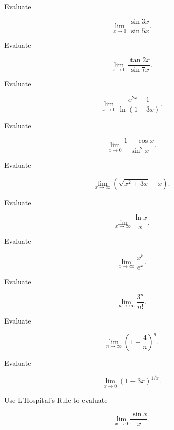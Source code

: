 \begin{exercise}[3]
Evaluate

\[
\lim_{x\to0}
\frac{\sin3x}{\sin5x}.
\]
\end{exercise}

\begin{exercise}[3]
Evaluate

\[
\lim_{x\to0}
\frac{\tan2x}{\sin7x}.
\]
\end{exercise}

\begin{exercise}[3]
Evaluate

\[
\lim_{x\to0}
\frac{e^{2x}-1}{\ln(1+3x)}.
\]
\end{exercise}

\begin{exercise}[3]
Evaluate

\[
\lim_{x\to0}
\frac{
1-\cos x
}{
\sin^2x
}.
\]
\end{exercise}

\begin{exercise}[3]
Evaluate

\[
\lim_{x\to\infty}
\left(
\sqrt{x^2+3x}-x
\right).
\]
\end{exercise}

\begin{exercise}[3]
Evaluate

\[
\lim_{x\to\infty}
\frac{\ln x}{x}.
\]
\end{exercise}

\begin{exercise}[3]
Evaluate

\[
\lim_{x\to\infty}
\frac{x^5}{e^x}.
\]
\end{exercise}

\begin{exercise}[3]
Evaluate

\[
\lim_{n\to\infty}
\frac{3^n}{n!}.
\]
\end{exercise}

\begin{exercise}[3]
Evaluate

\[
\lim_{n\to\infty}
\left(
1+\frac4n
\right)^n.
\]
\end{exercise}

\begin{exercise}[3]
Evaluate

\[
\lim_{x\to0}
(1+3x)^{1/x}.
\]
\end{exercise}

\begin{exercise}[3]
Use L'Hospital's Rule to evaluate

\[
\lim_{x\to0}
\frac{\sin x}{x}.
\]
\end{exercise}

